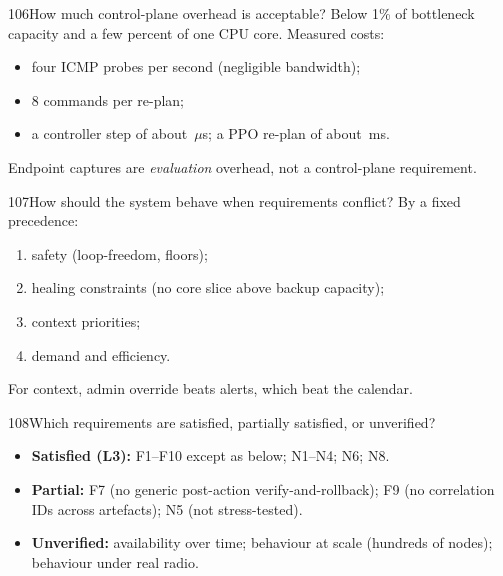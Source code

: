 \begin{qa}{106}{How much control-plane overhead is acceptable?}
Below 1\% of bottleneck capacity and a few percent of one CPU core. Measured costs:
\begin{itemize}
\item four ICMP probes per second (negligible bandwidth);
\item 8  commands per re-plan;
\item a controller step of about \NCtrlStepUs\,$\mu$s; a PPO re-plan of about \NPpoReplanMs\,ms.
\end{itemize}
Endpoint captures are \emph{evaluation} overhead, not a control-plane requirement.
\end{qa}

\begin{qa}{107}{How should the system behave when requirements conflict?}
By a fixed precedence:
\begin{enumerate}
\item safety (loop-freedom, floors);
\item healing constraints (no core slice above backup capacity);
\item context priorities;
\item demand and efficiency.
\end{enumerate}
For context, admin override beats alerts, which beat the calendar.
\end{qa}

\begin{qa}{108}{Which requirements are satisfied, partially satisfied, or unverified?}
\begin{itemize}
\item \textbf{Satisfied (L3):} F1--F10 except as below; N1--N4; N6; N8.
\item \textbf{Partial:} F7 (no generic post-action verify-and-rollback); F9 (no correlation IDs across artefacts);
N5 (not stress-tested).
\item \textbf{Unverified:} availability over time; behaviour at scale (hundreds of nodes); behaviour under real radio.
\end{itemize}
\end{qa}

